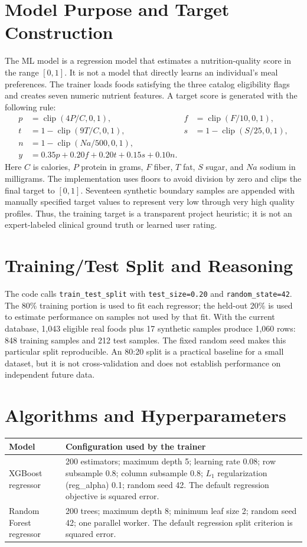 \documentclass[12pt,a4paper]{report}
\begin{document}
\section{Model Purpose and Target Construction}
The ML model is a regression model that estimates a nutrition-quality score in the range
$[0,1]$. It is not a model that directly learns an individual's meal preferences. The
trainer loads foods satisfying the three catalog eligibility flags and creates seven
numeric nutrient features. A target score is generated with the following rule:
\begin{align}
p &= \operatorname{clip}(4P/C,0,1), & f &= \operatorname{clip}(F/10,0,1),\\
t &= 1-\operatorname{clip}(9T/C,0,1), & s &= 1-\operatorname{clip}(S/25,0,1),\\
n &= 1-\operatorname{clip}(Na/500,0,1),\\
y &= 0.35p + 0.20f + 0.20t + 0.15s + 0.10n.
\end{align}
Here $C$ is calories, $P$ protein in grams, $F$ fiber, $T$ fat, $S$ sugar, and $Na$
sodium in milligrams. The implementation uses floors to avoid division by zero and clips
the final target to $[0,1]$. Seventeen synthetic boundary samples are appended with
manually specified target values to represent very low through very high quality profiles.
Thus, the training target is a transparent project heuristic; it is not an expert-labeled
clinical ground truth or learned user rating.

\section{Training/Test Split and Reasoning}
The code calls \texttt{train\_test\_split} with \texttt{test\_size=0.20} and
\texttt{random\_state=42}. The 80\%
training portion is used to fit each regressor; the held-out 20\% is used to estimate
performance on samples not used by that fit. With the current database, 1,043 eligible
real foods plus 17 synthetic samples produce 1,060 rows: 848 training samples and 212
test samples. The fixed random seed makes this particular split reproducible. An 80:20
split is a practical baseline for a small dataset, but it is not cross-validation and does
not establish performance on independent future data.

\section{Algorithms and Hyperparameters}
\begin{longtable}{p{}p{}}
\toprule
Model & Configuration used by the trainer\\
\midrule
XGBoost regressor & 200 estimators; maximum depth 5; learning rate 0.08; row
subsample 0.8; column subsample 0.8; $L_1$ regularization (reg\_alpha) 0.1;
random seed 42. The default regression objective is squared error.\\
Random Forest regressor & 200 trees; maximum depth 8; minimum leaf size 2;
random seed 42; one parallel worker. The default regression split criterion is squared
error.\\
\bottomrule
\end{longtable}
\end{document}
